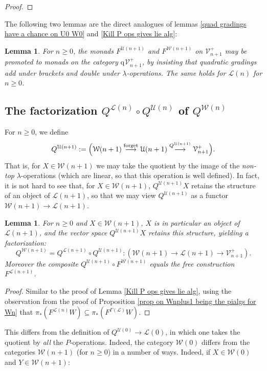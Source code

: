 \documentclass[11pt]{amsart} \renewcommand{\baselinestretch}{1.2}
\theoremstyle{plain}
\newtheorem{lem}[thm]{Lemma}
\numberwithin{equation}{section} %
\theoremstyle{plain}
\newtheorem{lem}[thm]{Lemma}
\numberwithin{equation}{chapter} %
\renewcommand{\to}{\longrightarrow}
\newcommand{\scrL}{\mathscr{L}}
\newcommand{\calU}{\mathcal{U}}
\newcommand{\calL}{\mathcal{L}}
\newcommand{\calV}{\mathcal{V}}
\newcommand{\calw}{\mathcal{W}}
\newcommand{\call}{\mathcal{L}}
\newcommand{\LieOperad}{{\scrL}}
\newcommand{\vect}[2]{\calV^{#1}_{#2}}
\newcommand{\quadgrad}[1]{\mathrm{q}_{#1}}
\newcommand{\SubsectionOrSection}[1]{\subsection{#1}}
\begin{document}
\begin{homotopy operations for PRLs}
\begin{proof}
\end{proof}
The following two lemmas are the direct analogues of lemmas \ref{quad gradings have a chance on U0 W0} and \ref{Kill P ops gives lie alg}:
\begin{lem}
\label{quad gradings have a chance on Un Wn}
For $n\geq0$, the monads $F^{\calU(n+1)}$ and $F^{\calw(n+1)}$ on $\vect{+}{n+1}$ may be promoted to monads on the category $\quadgrad{}\vect{+}{n+1}$, by insisting that quadratic gradings add under brackets and double under $\lambda$-operations. The same holds for $\call(n)$ for $n\geq0$.
\end{lem}
\SubsectionOrSection{The factorization $Q^{\calL(n)}\circ Q^{\calU(n)}$ of $Q^{\calw(n)}$}
For $n\geq0$, we define
\[Q^{\calU(n+1)}:=\Bigl(\calw(n+1)\overset{\textup{forget}}{\to}\calU(n+1)\overset{Q^{\calU(n+1)}}{\to}\vect{+}{n+1}\Bigr).\]
That is, for $X\in\calw(n+1)$ we may take the quotient by the image of the \emph{non-top} $\lambda$-operations (which are linear, so that this operation is well defined). In fact, it is not hard to see that, for $X\in\calw(n+1)$, $Q^{\calU(n+1)}X$ retains the structure of an object of $\calL(n+1)$, so that we may view $Q^{\calU(n+1)}$ as a functor $\calw(n+1)\to \calL(n+1)$.
\begin{lem}
\label{Kill lambda ops gives lie alg}
For $n\geq0$ and $X\in\calw(n+1)$, $X$ is in particular an object of $\calL(n+1)$, and the vector space $Q^{\calU(n+1)}X$ retains this structure, yielding a factorization:%
\[Q^{\calw(n+1)}=Q^{\calL(n+1)}\circ Q^{\calU(n+1)}:\left(\calw(n+1)\to \calL(n+1)\to \vect{+}{n+1}\right).\]
Moreover the composite $Q^{\calU(n+1)}\circ F^{\calw(n+1)}$ equals the free construction $F^{\calL(n+1)}$.
\end{lem}
\begin{proof}
Similar to the proof of Lemma \ref{Kill P ops gives lie alg}, using the observation from the proof of Proposition \ref{prop on Wnplus1 being the pialgs for Wn} that $\pi_*(F^{\calL(n)}W)\subseteq\pi_*(F^{\Gamma(\LieOperad)}W)$.
\end{proof}
This differs from the definition of $Q^{\calU(0)}\to \calL(0)$, in which one takes the quotient by \emph{all} the $P$-operations.
Indeed, the category $\calw(0)$ differs from the categories $\calw(n+1)$ (for $n\geq0$) in a number of ways. Indeed, if $X\in\calw(0)$ and $Y\in \calw(n+1) $:

\end{homotopy operations for PRLs}
\end{document}
